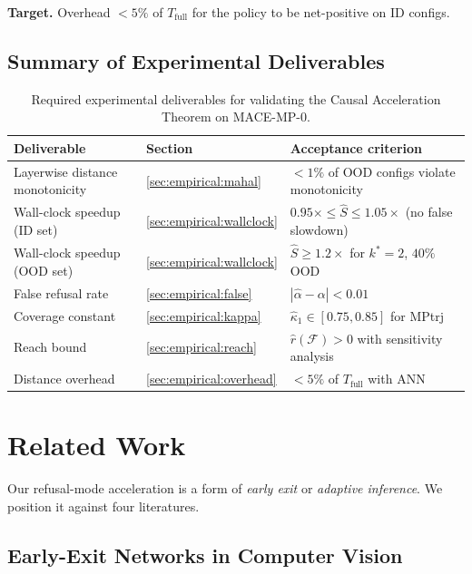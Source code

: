 \documentclass[11pt,a4paper]{article}
\begin{document}
\textbf{Target.} Overhead $<5\%$ of $T_{\text{full}}$ for the policy to be net-positive on ID configs.

\subsection{Summary of Experimental Deliverables}\label{sec:empirical:deliverables}

\begin{table}[htbp]
\centering
\caption{Required experimental deliverables for validating the Causal Acceleration Theorem on MACE-MP-0.}
\label{tab:deliverables}
\begin{tabular}{@{}lll@{}}
\toprule
\textbf{Deliverable} & \textbf{Section} & \textbf{Acceptance criterion} \\
\midrule
Layerwise distance monotonicity & \ref{sec:empirical:mahal} & $<1\%$ of OOD configs violate monotonicity \\
Wall-clock speedup (ID set) & \ref{sec:empirical:wallclock} & $0.95\times \le \hat S \le 1.05\times$ (no false slowdown) \\
Wall-clock speedup (OOD set) & \ref{sec:empirical:wallclock} & $\hat S \ge 1.2\times$ for $k^*=2$, $40\%$ OOD \\
False refusal rate & \ref{sec:empirical:false} & $|\hat\alpha - \alpha| < 0.01$ \\
Coverage constant & \ref{sec:empirical:kappa} & $\hat\kappa_1 \in [0.75,0.85]$ for MPtrj \\
Reach bound & \ref{sec:empirical:reach} & $\hat r(\mathcal{F}) > 0$ with sensitivity analysis \\
Distance overhead & \ref{sec:empirical:overhead} & $<5\%$ of $T_{\text{full}}$ with ANN \\
\bottomrule
\end{tabular}
\end{table}

\section{Related Work}\label{sec:related}

Our refusal-mode acceleration is a form of \emph{early exit} or \emph{adaptive inference}. We position it against four literatures.

\subsection{Early-Exit Networks in Computer Vision}
\end{document}
